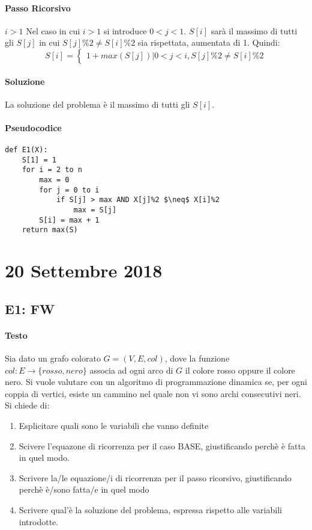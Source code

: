 \documentclass[12pt, a4paper, openany]{book}
\begin{document}
\paragraph*{Passo Ricorsivo} $i>1$
Nel caso in cui $i>1$ si introduce $0<j<1$. 
$S[i]$ sarà il massimo di tutti gli $S[j]$ in cui $S[j]\%2 \neq S[i]\%2$ sia rispettata, aumentata di 1.
Quindi:
$$
S[i]= \begin{cases}
	1 + max(S[j]) | 0 < j < i, S[j]\%2 \neq S[i]\%2
\end{cases}
$$
\paragraph*{Soluzione}
La soluzione del problema è il massimo di tutti gli $S[i]$.

\paragraph*{Pseudocodice}
\begin{lstlisting}[style=small]
def E1(X):
	S[1] = 1
	for i = 2 to n
		max = 0
		for j = 0 to i
			if S[j] > max AND X[j]%2 $\neq$ X[i]%2
				max = S[j]
		S[i] = max + 1
	return max(S) 
\end{lstlisting}

\section{20 Settembre 2018}
\subsection{E1: FW}
\paragraph{Testo}
Sia dato un grafo colorato $G=(V,E,col)$, dove la funzione $col:E\to \{rosso,nero\}$ associa ad ogni arco di $G$ il colore rosso oppure il colore nero.
Si vuole valutare con un algoritmo di programmazione dinamica se, per ogni coppia di vertici, esiste un cammino nel quale non vi sono archi consecutivi neri. Si chiede di:
\begin{enumerate}
	\item Esplicitare quali sono le variabili che vanno definite
	\item Scivere l'equazone di ricorrenza per il caso BASE, giustificando perchè è fatta in quel modo.
	\item Scrivere la/le equazione/i di ricorrenza per il passo ricorsivo, giustificando perchè è/sono fatta/e in quel modo
	\item Scrivere qual'è la soluzione del problema, espressa rispetto alle variabili introdotte.
\end{enumerate}
\end{document}
